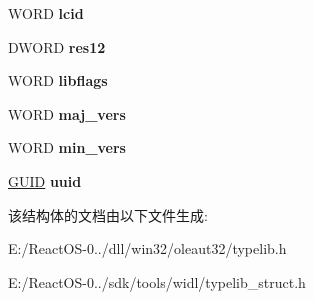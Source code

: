 \begin{DoxyCompactItemize}
W\+O\+RD {\bfseries lcid}
\item 
\mbox{\label{struct_s_l_t_g___lib_blk_a512d86ff57a853c20fba84f1393117d6}} 
D\+W\+O\+RD {\bfseries res12}
\item 
\mbox{\label{struct_s_l_t_g___lib_blk_a6ec6a4ce326160cd073aa50d76357fbc}} 
W\+O\+RD {\bfseries libflags}
\item 
\mbox{\label{struct_s_l_t_g___lib_blk_a46ff2bfa604f4e8e3e58828de19d8854}} 
W\+O\+RD {\bfseries maj\+\_\+vers}
\item 
\mbox{\label{struct_s_l_t_g___lib_blk_a0620371e5bef6e854778212c183b5441}} 
W\+O\+RD {\bfseries min\+\_\+vers}
\item 
\mbox{\label{struct_s_l_t_g___lib_blk_a6f692eb45e0fccbeaa98eb3ddb451de2}} 
\hyperlink{interface_g_u_i_d}{G\+U\+ID} {\bfseries uuid}
\end{DoxyCompactItemize}


该结构体的文档由以下文件生成\+:\begin{DoxyCompactItemize}
\item 
E\+:/\+React\+O\+S-\/0../dll/win32/oleaut32/typelib.\+h\item 
E\+:/\+React\+O\+S-\/0../sdk/tools/widl/typelib\+\_\+struct.\+h\end{DoxyCompactItemize}
